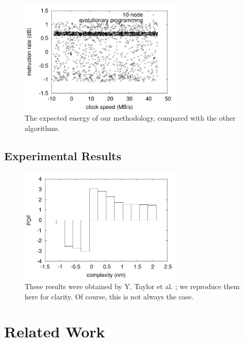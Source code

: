 \begin{figure}[htpb]
	\centering
	\includegraphics[width=0.7\textwidth]{figure2}
	\caption{%
	The expected energy of our methodology, compared with the other algorithms.
	}
	\label{fig:introLabel4}
\end{figure}


\section{Experimental Results}
%
\begin{figure}[htpb]
	\centering
	\includegraphics[width=0.7\textwidth]{figure3}
	\caption{
	These results were obtained by Y. Taylor et al. \cite{cite:3}; we reproduce
	them here for clarity. Of course, this is not always the case.
	}
	\label{fig:introLabel5}
\end{figure}






\chapter{Related Work}
%



